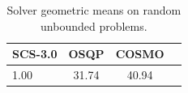 \begin{table}
\centering
\caption{Solver geometric means on random unbounded problems.}
\label{t-random unbounded-geom_mean}
\begin{tabular}{lccc}
\toprule
 SCS-3.0 &  OSQP &  COSMO \\
\midrule
    1.00 & 31.74 &  40.94 \\
\bottomrule
\end{tabular}
\end{table}
